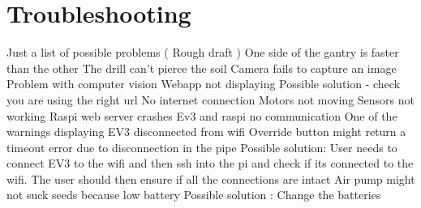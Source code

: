 \documentclass{article}
\begin{document}
\section{Troubleshooting}\label{sec:troubleshooting}
Just a list of possible problems ( Rough draft ) \newline
\newline
One side of the gantry is faster than the other \newline
The drill can’t pierce the soil \newline
Camera fails to capture an image \newline
Problem with computer vision \newline
Webapp not displaying \newline
Possible solution - check you are using the right url \newline
No internet connection \newline
Motors not moving \newline
Sensors not working \newline
Raspi web server crashes \newline
Ev3 and raspi no communication \newline
One of the warnings displaying \newline
EV3 disconnected from wifi \newline
Override button might return a timeout error due to disconnection in the pipe \newline
Possible solution: User needs to connect EV3 to the wifi and then ssh into the pi and check if its connected to the wifi. The user should then ensure if all the connections are intact \newline
Air pump might not suck seeds because low battery \newline
Possible solution : Change the batteries \newline






\end{document}
